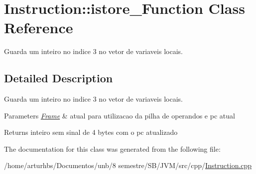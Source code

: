 \hypertarget{classInstruction_1_1istore__3Function}{}\section{Instruction\+:\+:istore\+\_\+Function Class Reference}
\label{classInstruction_1_1istore__3Function}


Guarda um inteiro no indice 3 no vetor de variaveis locais.  




\subsection{Detailed Description}
Guarda um inteiro no indice 3 no vetor de variaveis locais. 


\begin{DoxyParams}{Parameters}
{\em \hyperlink{classFrame}{Frame}} & atual para utilizacao da pilha de operandos e pc atual \\
\hline
\end{DoxyParams}
\begin{DoxyReturn}{Returns}
inteiro sem sinal de 4 bytes com o pc atualizado 
\end{DoxyReturn}


The documentation for this class was generated from the following file\+:\begin{DoxyCompactItemize}
\item 
/home/arturhbs/\+Documentos/unb/8 semestre/\+S\+B/\+J\+V\+M/src/cpp/\hyperlink{Instruction_8cpp}{Instruction.\+cpp}\end{DoxyCompactItemize}

